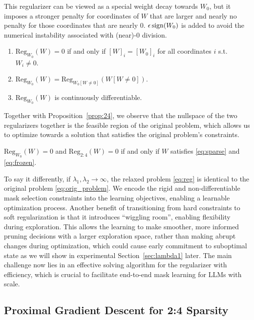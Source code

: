 This regularizer can be viewed as a special weight decay towards $W_0$, but it imposes a stronger penalty for coordinates of $W$ that are larger and nearly no penalty for those coordinates that are nearly $0$. $\epsilon \operatorname{sign}(W_0)$ is added to avoid the numerical instability associated with (near)-$0$ division. 
\begin{proposition}\label{prop:locality}
    \begin{enumerate}
        \item $\text{Reg}_{W_0}(W) = 0$ if and only if $[W]_i=[W_0]_i$ for all coordinates $i$ s.t. $W_i\neq 0$.
        \item  $\text{Reg}_{W_0}(W) = \text{Reg}_{W_0[W\neq 0]}(W[W\neq 0])$.
        \item $\text{Reg}_{W_0}(W)$ is continuously differentiable. 
    \end{enumerate}
\end{proposition}
Together with Proposition~\ref{prop:24}, we observe that the nullspace of the two regularizers together is the feasible region of the original problem, which allows us to optimize towards a solution that satisfies the original problem's constraints.
\begin{corollary}
$\text{Reg}_{W_0}(W) = 0$ and $\text{Reg}_{2:4}(W) = 0$ if and only if $W$ satisfies \eqref{eq:sparse} and \eqref{eq:frozen}. 
\end{corollary}
To say it differently, if $\lambda_1,\lambda_2\rightarrow \infty$, the relaxed problem \eqref{eq:reg} is identical to the original problem \eqref{eq:orig_problem}.
We encode the rigid and non-differentiable mask selection constraints into the learning objectives, enabling a learnable optimization process.
Another benefit of transitioning from hard constraints to soft  regularization is that it introduces ``wiggling room'', enabling flexibility during exploration. This allows the learning to make smoother, more informed pruning decisions with a larger exploration space, rather than making abrupt changes during optimization, which could cause early commitment to suboptimal state as we will show in experimental Section~\ref{sec:lambda1} later. The main challenge now lies in an effective solving algorithm for the regularizer with efficiency, which is crucial to facilitate end-to-end mask learning for LLMs with scale.

\subsection{Proximal Gradient Descent for 2:4 Sparsity}

